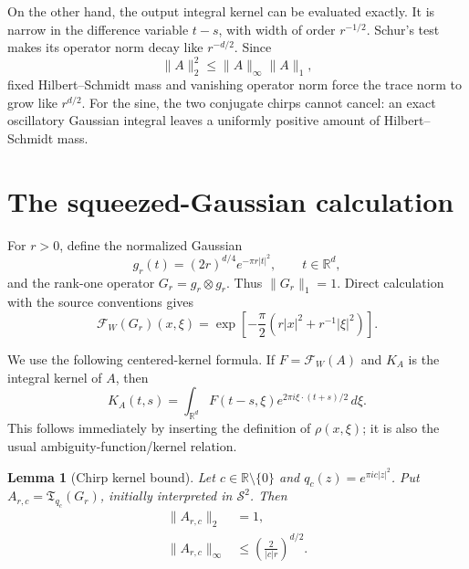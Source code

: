 \documentclass[11pt]{article}
\newtheorem{lemma}[theorem]{Lemma}
\newcommand{\R}{\mathbb R}
\newcommand{\Schat}{\mathcal S}
\newcommand{\FW}{\mathcal F_W}
\newcommand{\Tm}{\mathfrak T}
\begin{document}
On the other hand, the output integral kernel can be evaluated exactly.  It is
narrow in the difference variable $t-s$, with width of order $r^{-1/2}$.
Schur's test makes its operator norm decay like $r^{-d/2}$.  Since
\[
              \|A\|_2^2\le \|A\|_\infty\|A\|_1,
\]
fixed Hilbert--Schmidt mass and vanishing operator norm force the trace norm to
grow like $r^{d/2}$.  For the sine, the two conjugate chirps cannot cancel:
an exact oscillatory Gaussian integral leaves a uniformly positive amount of
Hilbert--Schmidt mass.

\section{The squeezed-Gaussian calculation}

For $r>0$, define the normalized Gaussian
\[
  g_r(t)=(2r)^{d/4}e^{-\pi r|t|^2},\qquad t\in\R^d,
\]
and the rank-one operator $G_r=g_r\otimes g_r$.  Thus
$\|G_r\|_1=1$.  Direct calculation with the source conventions gives
\begin{equation}\label{eq:ambiguity}
 \FW(G_r)(x,\xi)
 =\exp\left[-\frac\pi2\left(r|x|^2+r^{-1}|\xi|^2\right)\right].
\end{equation}

We use the following centered-kernel formula.  If $F=\FW(A)$ and $K_A$ is
the integral kernel of $A$, then
\begin{equation}\label{eq:centered}
 K_A(t,s)=\int_{\R^d}F(t-s,\xi)
       e^{2\pi i\xi\cdot(t+s)/2}\,d\xi.
\end{equation}
This follows immediately by inserting the definition of $\rho(x,\xi)$; it is
also the usual ambiguity-function/kernel relation.

\begin{lemma}[Chirp kernel bound]\label{lem:kernel}
Let $c\in\R\setminus\{0\}$ and $q_c(z)=e^{\pi i c|z|^2}$.  Put
$A_{r,c}=\Tm_{q_c}(G_r)$, initially interpreted in $\Schat^2$.  Then
\begin{align}
 \|A_{r,c}\|_2&=1,\label{eq:hsone}\\
 \|A_{r,c}\|_\infty&\le
       \left(\frac{2}{|c|r}\right)^{d/2}.\label{eq:opbound}
\end{align}
\end{lemma}
\end{document}
